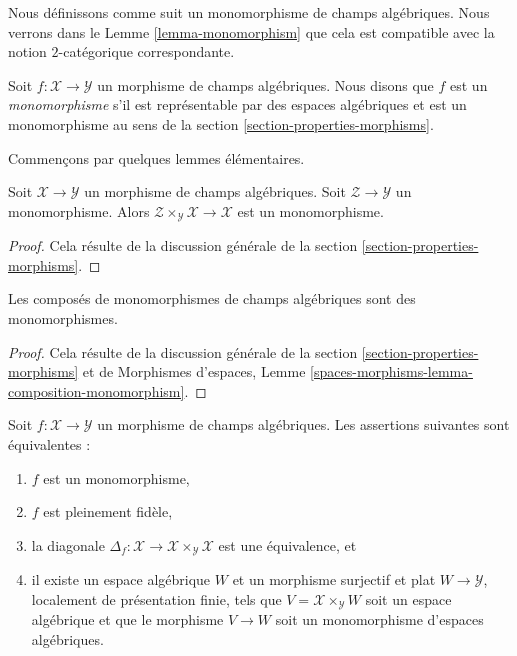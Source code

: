 \noindent
Nous définissons comme suit un monomorphisme de champs algébriques.
Nous verrons dans le
Lemme \ref{lemma-monomorphism}
que cela est compatible avec la notion $2$-catégorique correspondante.

\begin{definition}
\label{definition-monomorphism}
Soit $f : \mathcal{X} \to \mathcal{Y}$ un morphisme de champs algébriques.
Nous disons que $f$ est un {\it monomorphisme}
s'il est représentable par des espaces algébriques et est un monomorphisme au sens de la
section \ref{section-properties-morphisms}.
\end{definition}

\noindent
Commençons par quelques lemmes élémentaires.

\begin{lemma}
\label{lemma-base-change-monomorphism}
Soit $\mathcal{X} \to \mathcal{Y}$ un morphisme de champs algébriques.
Soit $\mathcal{Z} \to \mathcal{Y}$ un monomorphisme.
Alors $\mathcal{Z} \times_\mathcal{Y} \mathcal{X} \to \mathcal{X}$
est un monomorphisme.
\end{lemma}

\begin{proof}
Cela résulte de la discussion générale de la
section \ref{section-properties-morphisms}.
\end{proof}

\begin{lemma}
\label{lemma-composition-monomorphism}
Les composés de monomorphismes de champs algébriques sont des monomorphismes.
\end{lemma}

\begin{proof}
Cela résulte de la discussion générale de la
section \ref{section-properties-morphisms}
et de
Morphismes d'espaces,
Lemme \ref{spaces-morphisms-lemma-composition-monomorphism}.
\end{proof}

\begin{lemma}
\label{lemma-monomorphism}
Soit $f : \mathcal{X} \to \mathcal{Y}$ un morphisme de champs algébriques.
Les assertions suivantes sont équivalentes :
\begin{enumerate}
\item $f$ est un monomorphisme,
\item $f$ est pleinement fidèle,
\item la diagonale
$\Delta_f : \mathcal{X} \to \mathcal{X} \times_\mathcal{Y} \mathcal{X}$
est une équivalence, et
\item il existe un espace algébrique $W$ et un morphisme surjectif et plat
$W \to \mathcal{Y}$, localement de présentation finie, tels que
$V = \mathcal{X} \times_\mathcal{Y} W$ soit un espace algébrique et que le
morphisme $V \to W$ soit un monomorphisme d'espaces algébriques.
\end{enumerate}
\end{lemma}

